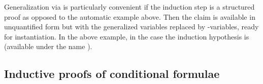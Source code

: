 \begin{isabellebody}
\begin{isamarkuptext}
Generalization via  is particularly convenient
if the induction step is a structured proof as opposed to the automatic
example above. Then the claim is available in unquantified form but
with the generalized variables replaced by -variables, ready
for instantiation. In the above example, in the  case the
induction hypothesis is  (available
under the name ).


\subsection{Inductive proofs of conditional formulae}
\label{sec:full-Ind}


\end{isamarkuptext}
\end{isabellebody}
